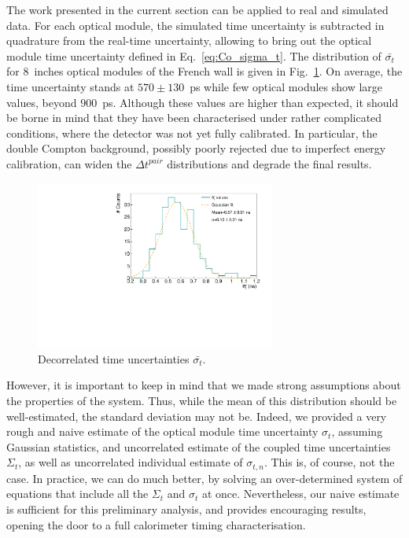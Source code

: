 The work presented in the current section can be applied to real and simulated data.
For each optical module, the simulated time uncertainty is subtracted in quadrature from the real-time uncertainty, allowing to bring out the optical module time uncertainty defined in Eq.~\eqref{eq:Co_sigma_t}.
The distribution of $\bar{\sigma_{t}}$ for $8$~inches optical modules of the French wall is given in Fig.~\ref{fig:final_sigmas}.
On average, the time uncertainty stands at $570\pm130$~ps while few optical modules show large values, beyond $900$~ps.
Although these values are higher than expected, it should be borne in mind that they have been characterised under rather complicated conditions, where the detector was not yet fully calibrated.
In particular, the double Compton background, possibly poorly rejected due to imperfect energy calibration, can widen the $\Delta t^{pair}$ distributions and degrade the final results.
\begin{figure}[h]
  \centering
  \includegraphics[width=0.7\textwidth]{CobaltStudy/fig_CobaltStudy/final_sigmas.pdf}
  \caption{Decorrelated time uncertainties $\bar{\sigma_{t}}$.
    \label{fig:final_sigmas}}
\end{figure}

However, it is important to keep in mind that we made strong assumptions about the properties of the system.
Thus, while the mean of this distribution should be well-estimated, the standard deviation may not be.
Indeed, we provided a very rough and naive estimate of the optical module time uncertainty $\sigma_{t}$, assuming Gaussian statistics, and uncorrelated estimate of the coupled time uncertainties $\Sigma_{t}$, as well as uncorrelated individual estimate of $\sigma_{t,n}$.
This is, of course, not the case.
In practice, we can do much better, by solving an over-determined system of equations that include all the $\Sigma_{t}$ and $\sigma_{t}$ at once.
Nevertheless, our naive estimate is sufficient for this preliminary analysis, and provides encouraging results, opening the door to a full calorimeter timing characterisation.

